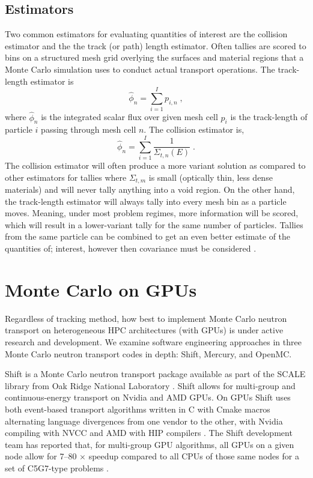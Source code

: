 \subsection{Estimators}
\label{c5:estimators}

Two common estimators for evaluating quantities of interest are the collision estimator and the the track (or path) length estimator.
Often tallies are scored to bins on a structured mesh grid overlying the surfaces and material regions that a Monte Carlo simulation uses to conduct actual transport operations.
The track-length estimator is
\begin{equation}
    \hat{\phi}_n = \sum_{i=1}^{I}p_{i,n} \; ,
\end{equation}
where $\hat{\phi}_n$ is the integrated scalar flux over given mesh cell $p_i$ is the track-length of particle $i$ passing through mesh cell $n$.
The collision estimator is,
\begin{equation}
    \hat{\phi}_n = \sum_{i=1}^{I} \frac{1}{\Sigma_{t,n}(E)} \;.
\end{equation}
The collision estimator will often produce a more variant solution as compared to other estimators for tallies where $\Sigma_{t,m}$ is small (optically thin, less dense materials) and will never tally anything into a void region.
On the other hand, the track-length estimator will always tally into every mesh bin as a particle moves.
Meaning, under most problem regimes, more information will be scored, which will result in a lower-variant tally for the same number of particles.
Tallies from the same particle can be combined to get an even better estimate of the quantities of; interest, however then covariance must be considered \cite{urbatsch_estimation_1995}.


\section{Monte Carlo on GPUs}

Regardless of tracking method, how best to implement Monte Carlo neutron transport on heterogeneous HPC architectures (with GPUs) is under active research and development.
We examine software engineering approaches in three Monte Carlo neutron transport codes in depth: Shift, Mercury, and OpenMC.

Shift is a Monte Carlo neutron transport package available as part of the SCALE library from Oak Ridge National Laboratory \cite{pandya_implementation_2016}.
Shift allows for multi-group and continuous-energy transport on Nvidia and AMD GPUs.
On GPUs Shift uses both event-based transport algorithms written in C with Cmake macros alternating language divergences from one vendor to the other, with Nvidia compiling with NVCC and AMD with HIP compilers \cite{mcsummit}.
The Shift development team has reported that, for multi-group GPU algorithms, all GPUs on a given node allow for 7--80 $\times$ speedup compared to all CPUs of those same nodes for a set of C5G7-type problems \cite{hamilton_multigroup_2018}.

